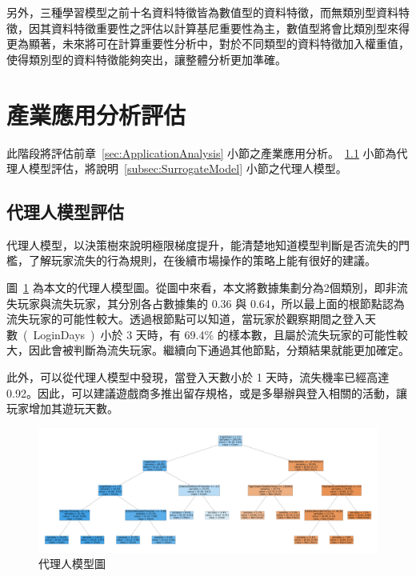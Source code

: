 另外，三種學習模型之前十名資料特徵皆為數值型的資料特徵，而無類別型資料特徵，因其資料特徵重要性之評估以計算基尼重要性為主，數值型將會比類別型來得更為顯著，未來將可在計算重要性分析中，對於不同類型的資料特徵加入權重值，使得類別型的資料特徵能夠突出，讓整體分析更加準確。

\section{產業應用分析評估}
\label{sec:ApplicationAnalysisEvaluation}

此階段將評估前章~\ref{sec:ApplicationAnalysis} 小節之產業應用分析。~\ref{subsec:SurrogateModelEvaluation} 小節為代理人模型評估，將說明~\ref{subsec:SurrogateModel} 小節之代理人模型。

\subsection{代理人模型評估}
\label{subsec:SurrogateModelEvaluation}

代理人模型，以決策樹來說明極限梯度提升，能清楚地知道模型判斷是否流失的門檻，了解玩家流失的行為規則，在後續市場操作的策略上能有很好的建議。

圖~\ref{fig:eva_SurrogateModel} 為本文的代理人模型圖。從圖中來看，本文將數據集劃分為2個類別，即非流失玩家與流失玩家，其分別各占數據集的 0.36 與 0.64，所以最上面的根節點認為流失玩家的可能性較大。透過根節點可以知道，當玩家於觀察期間之登入天數\ (\ LoginDays\ )\ 小於 3 天時，有 69.4\% 的樣本數，且屬於流失玩家的可能性較大，因此會被判斷為流失玩家。繼續向下通過其他節點，分類結果就能更加確定。

此外，可以從代理人模型中發現，當登入天數小於 1 天時，流失機率已經高達 0.92。因此，可以建議遊戲商多推出留存規格，或是多舉辦與登入相關的活動，讓玩家增加其遊玩天數。

\begin{figure}[!htb]
    \begin{center}
      \includegraphics[width=1.5\textwidth, angle=90]{figures/evaluation/Image_SurrogateModel.png}
      \caption[代理人模型圖]{代理人模型圖}
      \label{fig:eva_SurrogateModel}
    \end{center}
\end{figure}
\newpage